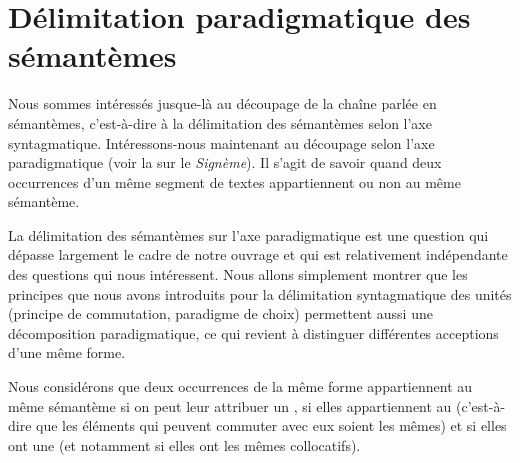 \section{Délimitation paradigmatique des sémantèmes}\label{sec:2.3.13}

Nous sommes intéressés jusque-là au découpage de la chaîne parlée en sémantèmes, c’est-à-dire à la délimitation des sémantèmes selon l’axe syntagmatique. Intéressons-nous maintenant au découpage selon l’axe paradigmatique (voir la  sur le \textit{Signème}). Il s’agit de savoir quand deux occurrences d’un même segment de textes appartiennent ou non au même sémantème.

La délimitation des sémantèmes sur l’axe paradigmatique est une question qui dépasse largement le cadre de notre ouvrage et qui est relativement indépendante des questions qui nous intéressent. Nous allons simplement montrer que les principes que nous avons introduits pour la délimitation syntagmatique des unités (principe de commutation, paradigme de choix) permettent aussi une décomposition paradigmatique, ce qui revient à distinguer différentes acceptions d’une même forme.

Nous considérons que deux occurrences de la même forme appartiennent au même sémantème si on peut leur attribuer un , si elles appartiennent au  (c’est-à-dire que les éléments qui peuvent commuter avec eux soient les mêmes) et si elles ont une  (et notamment si elles ont les mêmes collocatifs).

